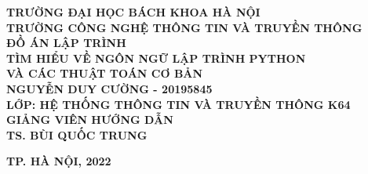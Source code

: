 \documentclass[main-report.tex]{subfiles}
\begin{document}
\begin{titlepage}
\thispagestyle{empty}
\thisfancypage{
\setlength{\fboxsep}{3pt}
\fbox}{} 
\begin{center}
{\bf\large TRƯỜNG ĐẠI HỌC BÁCH KHOA HÀ NỘI}\\
{\bf\subtitlesize TRƯỜNG CÔNG NGHỆ THÔNG TIN VÀ TRUYỀN THÔNG}\\[4cm]

{\bf\subtitlesize ĐỒ ÁN LẬP TRÌNH}\\[0.5cm]
{\bf\LARGE TÌM HIỂU VỀ NGÔN NGỮ LẬP TRÌNH PYTHON}\\
{\bf\LARGE VÀ CÁC THUẬT TOÁN CƠ BẢN}\\[4cm]

{\bf\large NGUYỄN DUY CƯỜNG - 20195845}\\
{\bf\large LỚP: HỆ THỐNG THÔNG TIN VÀ TRUYỀN THÔNG K64}\\[3.5cm]

{\bf GIẢNG VIÊN HƯỚNG DẪN}\\
{\bf TS. BÙI QUỐC TRUNG}
\end{center}

\vspace{4cm}
\begin{center}
{\bf TP. HÀ NỘI, 2022}
\end{center}
\end{titlepage}
\end{document}
